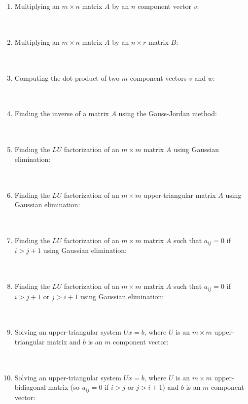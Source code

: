 \documentclass[11pt]{article}
\begin{document}
\begin{enumerate}
\item Multiplying an $m \times n$ matrix $A$ by an $n$ component vector $v$: \\ \\ \\
\item Multiplying an $m \times n$ matrix $A$ by an $n \times r$ matrix $B$: \\ \\ \\

\item Computing the dot product of two $m$ component vectors $v$ and $w$: \\ \\ \\

\item Finding the inverse of a matrix $A$ using the Gauss-Jordan method: \\ \\ \\
 
\item Finding the $LU$ factorization of an $m \times m$ matrix $A$ using Gaussian elimination: \\ \\ \\

\item Finding the $LU$ factorization of an $m \times m$ upper-triangular matrix $A$ using Gaussian elimination: \\ \\ \\

\item Finding the $LU$ factorization of an $m \times m$ matrix $A$ such that $a_{ij} =0$ if $i > j+1$ using Gaussian elimination: \\ \\ \\

\item Finding the $LU$ factorization of an $m \times m$ matrix $A$ such that $a_{ij} =0$ if $i > j+1$ or $j > i +1$ using Gaussian elimination: \\ \\ \\

\item Solving an upper-triangular system $Ux = b$, where $U$ is an $m \times m$ upper-triangular matrix and $b$ is an $m$ component vector:\\ \\ \\

\item Solving an upper-triangular system $Ux = b$, where $U$ is an $m \times m$ upper-bidiagonal matrix (so $u_{ij} =0$ if $i > j$ or $j > i +1$) and $b$ is an $m$ component vector:

\end{enumerate}
\end{document}
